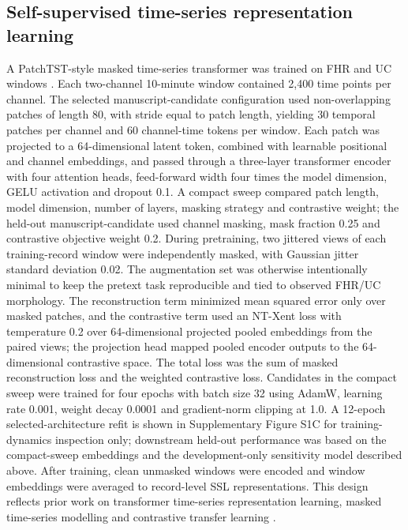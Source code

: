 \documentclass[utf8]{FrontiersinHarvard}
\begin{document}
\subsection{Self-supervised time-series representation learning}

A PatchTST-style masked time-series transformer was trained on FHR and UC windows \citep{nie2023}. Each two-channel 10-minute window contained 2,400 time points per channel. The selected manuscript-candidate configuration used non-overlapping patches of length 80, with stride equal to patch length, yielding 30 temporal patches per channel and 60 channel-time tokens per window. Each patch was projected to a 64-dimensional latent token, combined with learnable positional and channel embeddings, and passed through a three-layer transformer encoder with four attention heads, feed-forward width four times the model dimension, GELU activation and dropout 0.1. A compact sweep compared patch length, model dimension, number of layers, masking strategy and contrastive weight; the held-out manuscript-candidate used channel masking, mask fraction 0.25 and contrastive objective weight 0.2. During pretraining, two jittered views of each training-record window were independently masked, with Gaussian jitter standard deviation 0.02. The augmentation set was otherwise intentionally minimal to keep the pretext task reproducible and tied to observed FHR/UC morphology. The reconstruction term minimized mean squared error only over masked patches, and the contrastive term used an NT-Xent loss with temperature 0.2 over 64-dimensional projected pooled embeddings from the paired views; the projection head mapped pooled encoder outputs to the 64-dimensional contrastive space. The total loss was the sum of masked reconstruction loss and the weighted contrastive loss. Candidates in the compact sweep were trained for four epochs with batch size 32 using AdamW, learning rate 0.001, weight decay 0.0001 and gradient-norm clipping at 1.0. A 12-epoch selected-architecture refit is shown in Supplementary Figure S1C for training-dynamics inspection only; downstream held-out performance was based on the compact-sweep embeddings and the development-only sensitivity model described above. After training, clean unmasked windows were encoded and window embeddings were averaged to record-level SSL representations. This design reflects prior work on transformer time-series representation learning, masked time-series modelling and contrastive transfer learning \citep{zerveas2021,nie2023,yue2022,zhang2022tfc,goswami2024moment}.
\end{document}
